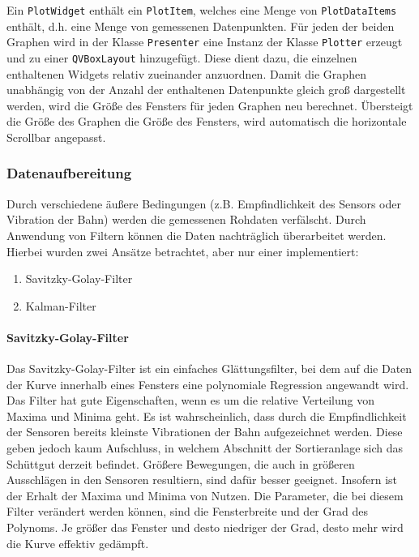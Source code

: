 Ein \texttt{PlotWidget} enthält ein \texttt{PlotItem}, welches eine Menge von \texttt{PlotDataItems} enthält, d.h. eine Menge von gemessenen Datenpunkten.
Für jeden der beiden Graphen wird in der Klasse \texttt{Presenter} eine Instanz der Klasse \texttt{Plotter} erzeugt und zu einer \texttt{QVBoxLayout} hinzugefügt. Diese dient dazu, die einzelnen enthaltenen Widgets relativ zueinander anzuordnen.
Damit die Graphen unabhängig von der Anzahl der enthaltenen Datenpunkte gleich groß dargestellt werden, wird die Größe des Fensters für jeden Graphen neu berechnet. Übersteigt die Größe des Graphen die Größe des Fensters, wird automatisch die horizontale Scrollbar angepasst.
\subsubsection{Datenaufbereitung}
Durch verschiedene äußere Bedingungen (z.B. Empfindlichkeit des Sensors oder Vibration der Bahn) werden die gemessenen Rohdaten verfälscht. Durch Anwendung von Filtern können die Daten nachträglich überarbeitet werden.
Hierbei wurden zwei Ansätze betrachtet, aber nur einer implementiert:
\begin{enumerate}
\item Savitzky-Golay-Filter
\item Kalman-Filter
\end{enumerate}
\paragraph{Savitzky-Golay-Filter}
Das Savitzky-Golay-Filter ist ein einfaches Glättungsfilter, bei dem auf die Daten der Kurve innerhalb eines Fensters eine polynomiale Regression angewandt wird. Das Filter hat gute Eigenschaften, wenn es um die relative Verteilung von Maxima und Minima geht. Es ist wahrscheinlich, dass durch die Empfindlichkeit der Sensoren bereits kleinste Vibrationen der Bahn aufgezeichnet werden. Diese geben jedoch kaum Aufschluss, in welchem Abschnitt der Sortieranlage sich das Schüttgut derzeit befindet. Größere Bewegungen, die auch in größeren Ausschlägen in den Sensoren resultiern, sind dafür besser geeignet. Insofern ist der Erhalt der Maxima und Minima von Nutzen.
Die Parameter, die bei diesem Filter verändert werden können, sind die Fensterbreite und der Grad des Polynoms. Je größer das Fenster und desto niedriger der Grad, desto mehr wird die Kurve effektiv gedämpft.
